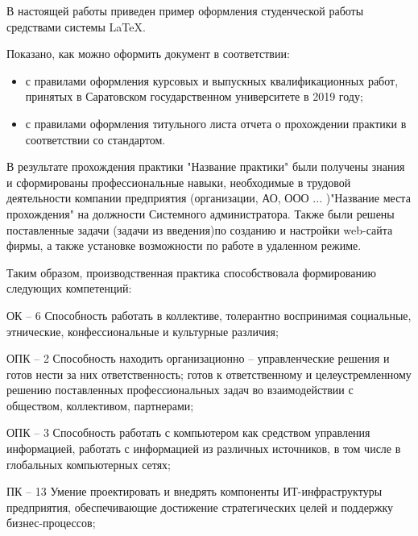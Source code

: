 \documentclass[bachelor, och, coursework, times]{SCWorks}
\begin{document}
\conclusion
В настоящей работы приведен пример оформления студенческой работы средствами системы \LaTeX.

Показано, как можно оформить документ в соответствии:
\begin{itemize}
    \item с правилами оформления курсовых и выпускных квалификационных работ, принятых в Саратовском государственном университете в 2019 году;
    \item с правилами оформления титульного листа отчета о прохождении практики в соответствии со стандартом.
\end{itemize}


В результате прохождения практики "Название практики"  были получены знания и сформированы профессиональные навыки, необходимые в трудовой деятельности компании предприятия (организации, АО, ООО ... )"Название места прохождения" на
должности Системного администратора. Также были решены поставленные задачи (задачи из введения)по созданию и настройки web-сайта фирмы, а также установке
возможности по работе в удаленном режиме.

Таким образом, производственная практика способствовала формированию следующих компетенций:%

ОК – 6 Способность работать в коллективе, толерантно воспринимая социальные, этнические, конфессиональные и культурные различия;

ОПК – 2 Способность находить организационно – управленческие решения и готов нести за них ответственность; готов к ответственному и целеустремленному решению поставленных профессиональных задач во взаимодействии с обществом, коллективом, партнерами;

ОПК – 3 Способность работать с компьютером как средством управления информацией, работать с информацией из различных источников, в том числе в глобальных компьютерных сетях;

ПК – 13 Умение проектировать и внедрять компоненты ИТ-инфраструктуры предприятия, обеспечивающие достижение стратегических целей и поддержку бизнес-процессов;
\end{document}
